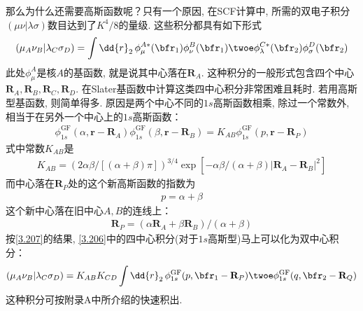 那么为什么还需要高斯函数呢？只有一个原因, 
在SCF计算中, 
所需的双电子积分$(\mu\nu|\lambda\sigma)$数目达到了$K^4/8$的量级. 
这些积分都具有如下形式
\begin{align}
	\label{3.206}
	(\mu_A\nu_B|\lambda_C\sigma_D) = \int\dd{r}_2\,\phi_\mu^{A*}(\bfr_1)\phi_\nu^B(\bfr_1)\twoe\phi_\lambda^{C*}(\bfr_2)\phi_\sigma^D(\bfr_2)
\end{align}
此处$\phi_\mu^A$是核$A$的基函数, 
就是说其中心落在$\mathbf{R}_A$. 
这种积分的一般形式包含四个中心$\mathbf{R}_A,\mathbf{R}_B,\mathbf{R}_C,\mathbf{R}_D$. 
在Slater基函数中计算这类四中心积分非常困难且耗时. 
若用高斯型基函数, 
则简单得多. 
原因是两个中心不同的$1s$高斯函数相乘, 
除过一个常数外, 
相当于在另外一个中心上的$1s$高斯函数：
\begin{align}
	\label{3.207}
	\phi_{1s}^\mathrm{GF}(\alpha,\mathbf{r-R}_A)\phi_{1s}^\mathrm{GF}(\beta,\mathbf{r-R}_B) = K_{AB}\phi_{1s}^\mathrm{GF}(p,\mathbf{r-R}_P)
\end{align}
式中常数$K_{AB}$是
\begin{align}
    K_{AB} = (2\alpha\beta/[(\alpha+\beta)\pi])^{3/4}\exp{[-\alpha\beta/(\alpha+\beta)|\mathbf{R}_A-\mathbf{R}_B|^2]}
\end{align}
而中心落在$\mathbf{R}_P$处的这个新高斯函数的指数为
\begin{align}
	p=\alpha+\beta
\end{align}
这个新中心落在旧中心$A,B$的连线上：
\begin{align}
	\mathbf{R}_P = (\alpha\mathbf{R}_A+\beta\mathbf{R}_B)/(\alpha+\beta)
\end{align}
按\autoref{3.207}的结果, 
\autoref{3.206}中的四中心积分(对于$1s$高斯型)马上可以化为双中心积分：
\begin{align}
	(\mu_A\nu_B|\lambda_C\sigma_D) =K_{AB}K_{CD} \int\dd{r}_2\,\phi_{1s}^\mathrm{GF}(p,\bfr_1-\mathbf{R}_P)\twoe\phi_{1s}^\mathrm{GF}(q,\bfr_2-\mathbf{R}_Q)
\end{align}
这种积分可按附录A中所介绍的快速积出.


